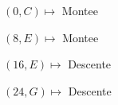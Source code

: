 \documentclass[preview]{standalone}
\begin{document}
\begin{center}
$(0,C) \mapsto$ Montee

$(8,E) \mapsto$ Montee

$(16,E) \mapsto$ Descente

$(24,G) \mapsto$ Descente
\end{center}
\end{document}
